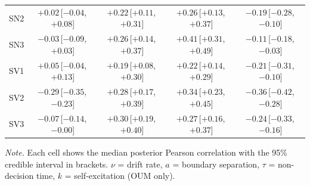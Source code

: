 \begin{table}[ht]
\begin{tabular}{l cccc}
SN2 & $+0.02$\,[$-0.04$,\,$+0.08$] & $+0.22$\,[$+0.11$,\,$+0.31$] & $+0.26$\,[$+0.13$,\,$+0.37$] & $-0.19$\,[$-0.28$,\,$-0.10$] \\
SN3 & $-0.03$\,[$-0.09$,\,$+0.03$] & $+0.26$\,[$+0.14$,\,$+0.37$] & $+0.41$\,[$+0.31$,\,$+0.49$] & $-0.11$\,[$-0.18$,\,$-0.03$] \\
SV1 & $+0.05$\,[$-0.04$,\,$+0.13$] & $+0.19$\,[$+0.08$,\,$+0.30$] & $+0.22$\,[$+0.14$,\,$+0.29$] & $-0.21$\,[$-0.31$,\,$-0.10$] \\
SV2 & $-0.29$\,[$-0.35$,\,$-0.23$] & $+0.28$\,[$+0.17$,\,$+0.39$] & $+0.34$\,[$+0.23$,\,$+0.45$] & $-0.36$\,[$-0.42$,\,$-0.28$] \\
SV3 & $-0.07$\,[$-0.14$,\,$-0.00$] & $+0.30$\,[$+0.19$,\,$+0.40$] & $+0.27$\,[$+0.16$,\,$+0.37$] & $-0.24$\,[$-0.33$,\,$-0.16$] \\
\bottomrule
\end{tabular}

\vspace{4pt}
\noindent\textit{Note.} Each cell shows the median posterior Pearson correlation with the 95\% credible interval in brackets. $\nu$ = drift rate, $a$ = boundary separation, $\tau$ = non-decision time, $k$ = self-excitation (OUM only).
\end{table}
